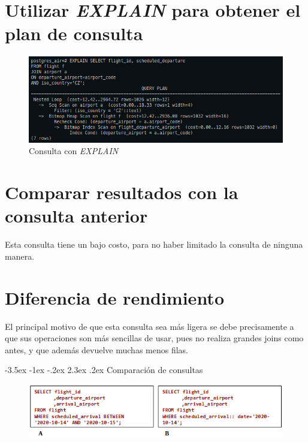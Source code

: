 \documentclass[11pt]{report}
\makeatletter
\renewcommand\chapter{\@startsection{chapter}{0}{\z@}%
    {-3.5ex \@plus -1ex \@minus -.2ex}%
    {2.3ex \@plus.2ex}%
    {\normalfont\Large\bfseries}}
\makeatother
\begin{document}
\section{Utilizar \emph{EXPLAIN} para obtener el plan de consulta}
\begin{figure}[H]
  \centering
  \includegraphics[scale=0.55]{img/consulta_explain_CZ.png}
  \caption{Consulta con \emph{EXPLAIN}}
  \label{fig:consulta con EXPLAIN CZ}
\end{figure}

\section{Comparar resultados con la consulta anterior}
Esta consulta tiene un bajo costo, para no haber limitado la consulta de ninguna manera.

\section{Diferencia de rendimiento}
El principal motivo de que esta consulta sea más ligera se debe precisamente a que sus
operaciones son más sencillas de usar, pues no realiza grandes joins como antes, y que
además devuelve muchas menos filas.

\cleardoublepage

\chapter{Comparación de consultas}
\begin{figure}[H]
  \centering
  \includegraphics[scale=0.7]{img/comparacion_rendimiento.png}
  \label{fig:comparación de rendimiento}
\end{figure}
\end{document}
